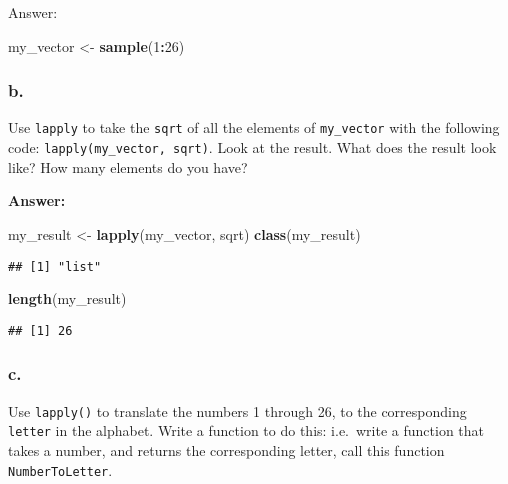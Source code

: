 \documentclass[]{article}
\newenvironment{Shaded}{\begin{snugshade}}{\end{snugshade}}
\newcommand{\DecValTok}[1]{\textcolor[rgb]{0.00,0.00,0.81}{#1}}
\newcommand{\KeywordTok}[1]{\textcolor[rgb]{0.13,0.29,0.53}{\textbf{#1}}}
\newcommand{\NormalTok}[1]{#1}
\newcommand{\OperatorTok}[1]{\textcolor[rgb]{0.81,0.36,0.00}{\textbf{#1}}}
\newcommand{\StringTok}[1]{\textcolor[rgb]{0.31,0.60,0.02}{#1}}
\begin{document}
Answer:

\begin{Shaded}
\begin{Highlighting}[]
\NormalTok{my_vector <-}\StringTok{ }\KeywordTok{sample}\NormalTok{(}\DecValTok{1}\OperatorTok{:}\DecValTok{26}\NormalTok{)}
\end{Highlighting}
\end{Shaded}

\hypertarget{b.-3}{%
\subsubsection{b.}\label{b.-3}}

Use \texttt{lapply} to take the \texttt{sqrt} of all the elements of
\texttt{my\_vector} with the following code:
\texttt{lapply(my\_vector,\ sqrt)}. Look at the result. What does the
result look like? How many elements do you have?

\textbf{Answer:}

\begin{Shaded}
\begin{Highlighting}[]
\NormalTok{my_result <-}\StringTok{ }\KeywordTok{lapply}\NormalTok{(my_vector, sqrt)}
\KeywordTok{class}\NormalTok{(my_result)}
\end{Highlighting}
\end{Shaded}

\begin{verbatim}
## [1] "list"
\end{verbatim}

\begin{Shaded}
\begin{Highlighting}[]
\KeywordTok{length}\NormalTok{(my_result)}
\end{Highlighting}
\end{Shaded}

\begin{verbatim}
## [1] 26
\end{verbatim}

\hypertarget{c.-3}{%
\subsubsection{c.}\label{c.-3}}

Use \texttt{lapply()} to translate the numbers 1 through 26, to the
corresponding \texttt{letter} in the alphabet. Write a function to do
this: i.e.~write a function that takes a number, and returns the
corresponding letter, call this function \texttt{NumberToLetter}.
\end{document}
